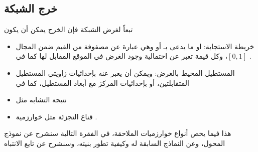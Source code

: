 \subsection{خرج الشبكة}
تبعاً لغرض الشبكة فإن الخرج يمكن أن يكون
\begin{itemize}
	\item خريطة الاستجابة: او ما يدعى بـ 
أو
وهي عبارة عن مصفوفة من القيم ضمن المجال
	$[0,1]$،
وكل قيمة تعبر عن احتمالية وجود الغرض  في الموقع المقابل لها	كما في 
	.
	\item 
	المستطيل المحيط بالغرض: ويمكن أن يعبر عنه بإحداثيات زاويتي المستطيل المتقابلتين، أو بإحداثيات المركز مع أبعاد المستطيل،
	كما في 
	\item 
	نتيجة التشابه
		 مثل
	\item 
	قناع التجزئة
	مثل خوارزمية 
	.
\end{itemize}
هذا فيما يخص أنواع خوارزميات الملاحقة، في الفقرة التالية سنشرح عن نموذج المحول، وعن النماذج السابقة له وكيفية تطور بنيته، وسنشرح عن تابع الانتباه 